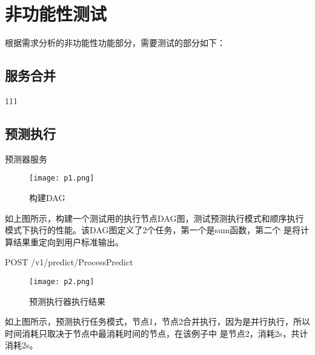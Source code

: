 \section{非功能性测试}

根据需求分析的非功能性功能部分，需要测试的部分如下：

\subsection{服务合并}
111
%
%
%
%
%

\subsection{预测执行}

预测器服务

\begin{figure}[H]
    \centering
    \texttt{[image: p1.png]}
    \caption{构建DAG}
    \label{fig:6-3-2}
\end{figure}

如上图所示，构建一个测试用的执行节点DAG图，测试预测执行模式和顺序执行模式下执行的性能。该DAG图定义了2个任务，第一个是sum函数，第二个
是将计算结果重定向到用户标准输出。


POST /v1/predict/ProcessPredict

\begin{figure}[H]
    \centering
    \texttt{[image: p2.png]}
    \caption{预测执行器执行结果}
    \label{fig:6-3-3}
\end{figure}

如上图所示，预测执行任务模式，节点1，节点2合并执行，因为是并行执行，所以时间消耗只取决于节点中最消耗时间的节点，在该例子中
是节点2，消耗2s，共计消耗2s。

